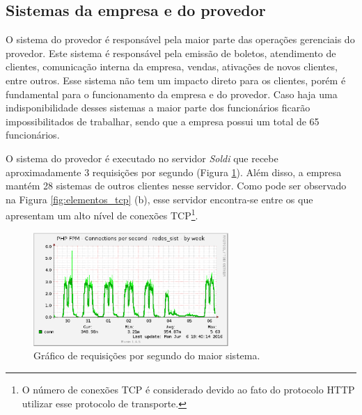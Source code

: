 \subsection{Sistemas da empresa e do provedor}
\label{section:sistemas}

O sistema do provedor é responsável pela maior parte das operações gerenciais do provedor. Este sistema é responsável pela emissão de 
boletos, atendimento de clientes, comunicação interna da empresa, vendas, ativações de novos clientes, entre outros. Esse sistema não tem um 
impacto direto para os clientes, porém é fundamental para o funcionamento da empresa e do provedor. Caso haja uma indisponibilidade desses sistemas 
a maior parte dos funcionários ficarão impossibilitados de trabalhar, sendo que a empresa possui um total de 65 funcionários.

O sistema do provedor é executado no servidor \textit{Soldi} que recebe aproximadamente 3 requisições  \cite{tanenbaum2011} por segundo
(Figura \ref{fig:soldi_week}). Além disso, a empresa mantém 28 sistemas de outros clientes nesse servidor. 
Como pode ser observado na Figura \ref{fig:elementos_tcp} (b), esse servidor encontra-se entre os que apresentam um alto nível de conexões 
\ac{TCP}\footnote[1]{O número de conexões \ac{TCP} é considerado devido ao fato do protocolo \ac{HTTP} utilizar esse 
protocolo de transporte.}.


\begin{figure}[h!]
 \centering
 \includegraphics[width=280px]{img/soldi_week.eps}
 \caption{Gráfico de requisições por segundo do maior sistema.}
 \label{fig:soldi_week}
\end{figure}

